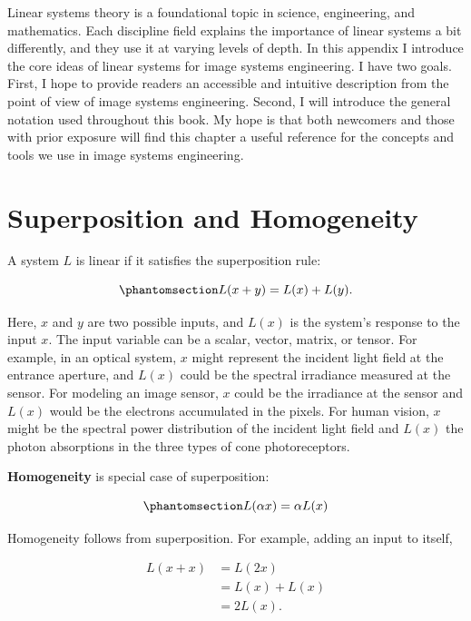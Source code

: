 \documentclass[
  letterpaper,
]{book}
\begin{document}
Linear systems theory is a foundational topic in science, engineering,
and mathematics. Each discipline field explains the importance of linear
systems a bit differently, and they use it at varying levels of depth.
In this appendix I introduce the core ideas of linear systems for image
systems engineering. I have two goals. First, I hope to provide readers
an accessible and intuitive description from the point of view of image
systems engineering. Second, I will introduce the general notation used
throughout this book. My hope is that both newcomers and those with
prior exposure will find this chapter a useful reference for the
concepts and tools we use in image systems engineering.

\section{Superposition and Homogeneity}\label{sec-ls-superposition}

A system \(L\) is linear if it satisfies the superposition rule:

\begin{equation}\phantomsection\label{eq-superposition}{
L(x + y) = L(x) + L(y).
}\end{equation}

Here, \(x\) and \(y\) are two possible inputs, and \(L(x)\) is the
system's response to the input \(x\). The input variable can be a
scalar, vector, matrix, or tensor. For example, in an optical system,
\(x\) might represent the incident light field at the entrance aperture,
and \(L(x)\) could be the spectral irradiance measured at the sensor.
For modeling an image sensor, \(x\) could be the irradiance at the
sensor and \(L(x)\) would be the electrons accumulated in the pixels.
For human vision, \(x\) might be the spectral power distribution of the
incident light field and \(L(x)\) the photon absorptions in the three
types of cone photoreceptors.

\textbf{Homogeneity} is special case of superposition:

\begin{equation}\phantomsection\label{eq-homogeneity}{
L(\alpha x) = \alpha L(x)
}\end{equation}

Homogeneity follows from superposition. For example, adding an input to
itself,

\[\begin{aligned}
L(x + x) &= L(2x) \nonumber  \\ 
&= L(x) + L(x) \nonumber \\
&= 2L(x) . \nonumber
\end{aligned}
\]
\end{document}
